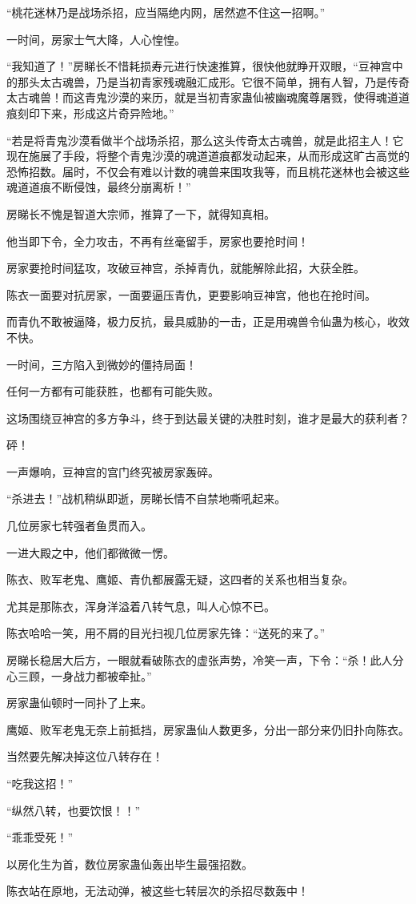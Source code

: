 \begin{this_body}
“桃花迷林乃是战场杀招，应当隔绝内网，居然遮不住这一招啊。”

一时间，房家士气大降，人心惶惶。

“我知道了！”房睇长不惜耗损寿元进行快速推算，很快他就睁开双眼，“豆神宫中的那头太古魂兽，乃是当初青家残魂融汇成形。它很不简单，拥有人智，乃是传奇太古魂兽！而这青鬼沙漠的来历，就是当初青家蛊仙被幽魂魔尊屠戮，使得魂道道痕刻印下来，形成这片奇异险地。”

“若是将青鬼沙漠看做半个战场杀招，那么这头传奇太古魂兽，就是此招主人！它现在施展了手段，将整个青鬼沙漠的魂道道痕都发动起来，从而形成这旷古高觉的恐怖招数。届时，不仅会有难以计数的魂兽来围攻我等，而且桃花迷林也会被这些魂道道痕不断侵蚀，最终分崩离析！”

房睇长不愧是智道大宗师，推算了一下，就得知真相。

他当即下令，全力攻击，不再有丝毫留手，房家也要抢时间！

房家要抢时间猛攻，攻破豆神宫，杀掉青仇，就能解除此招，大获全胜。

陈衣一面要对抗房家，一面要逼压青仇，更要影响豆神宫，他也在抢时间。

而青仇不敢被逼降，极力反抗，最具威胁的一击，正是用魂兽令仙蛊为核心，收效不快。

一时间，三方陷入到微妙的僵持局面！

任何一方都有可能获胜，也都有可能失败。

这场围绕豆神宫的多方争斗，终于到达最关键的决胜时刻，谁才是最大的获利者？

砰！

一声爆响，豆神宫的宫门终究被房家轰碎。

“杀进去！”战机稍纵即逝，房睇长情不自禁地嘶吼起来。

几位房家七转强者鱼贯而入。

一进大殿之中，他们都微微一愣。

陈衣、败军老鬼、鹰姬、青仇都展露无疑，这四者的关系也相当复杂。

尤其是那陈衣，浑身洋溢着八转气息，叫人心惊不已。

陈衣哈哈一笑，用不屑的目光扫视几位房家先锋：“送死的来了。”

房睇长稳居大后方，一眼就看破陈衣的虚张声势，冷笑一声，下令：“杀！此人分心三顾，一身战力都被牵扯。”

房家蛊仙顿时一同扑了上来。

鹰姬、败军老鬼无奈上前抵挡，房家蛊仙人数更多，分出一部分来仍旧扑向陈衣。

当然要先解决掉这位八转存在！

“吃我这招！”

“纵然八转，也要饮恨！！”

“乖乖受死！”

以房化生为首，数位房家蛊仙轰出毕生最强招数。

陈衣站在原地，无法动弹，被这些七转层次的杀招尽数轰中！

\end{this_body}

